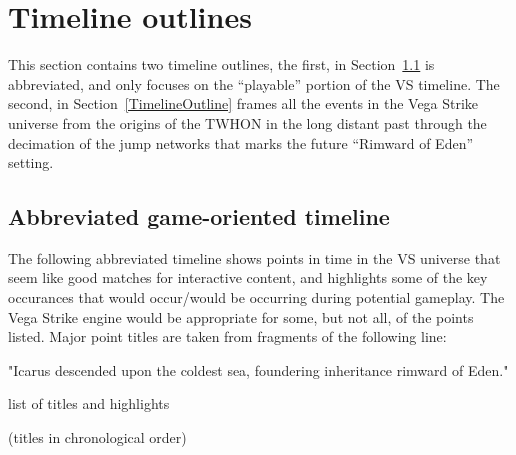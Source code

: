 \section{Timeline outlines}

This section contains two timeline outlines, the first, in
Section~\ref{Abbrevtimeline} is abbreviated, and only focuses on the
``playable'' portion of the VS timeline. The second, in
Section~\ref{TimelineOutline} frames all the events in the Vega Strike
universe from the origins of the TWHON in the long distant past
through the decimation of the jump networks that marks the future
``Rimward of Eden'' setting.


\subsection{Abbreviated game-oriented timeline}
\label{Abbrevtimeline}
The following abbreviated timeline shows points in time in the VS
universe that seem like good matches for interactive content, and
highlights some of the key occurances that would occur/would be
occurring during potential gameplay. The Vega Strike engine would be
appropriate for some, but not all, of the points listed. Major point
titles are taken from fragments of the following line:

{\Large \centerline{"Icarus descended upon the coldest sea, foundering inheritance rimward of Eden."}}
list of titles and highlights

(titles in chronological order)


